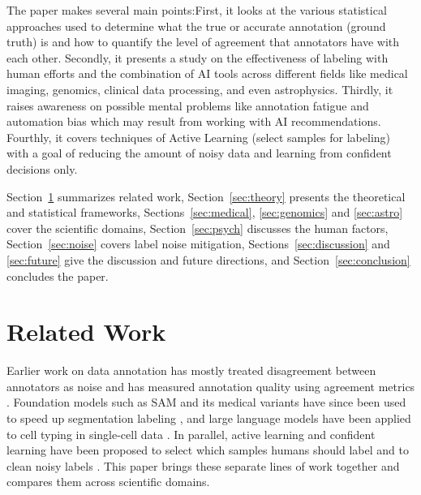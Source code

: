\documentclass[10pt, conference, letterpaper]{IEEEtran}
\newif\ifshowadded
\newcommand{\added}[1]{\ifshowadded{\color{blue}#1}\else #1\fi}
\begin{document}
\added{The‍‍‍ paper makes several main points:First, it looks at the various statistical approaches used to determine what the true or accurate annotation (ground truth) is and how to quantify the level of agreement that annotators have with each other. Secondly, it presents a study on the effectiveness of labeling with human efforts and the combination of AI tools across different fields like medical imaging, genomics, clinical data processing, and even astrophysics. Thirdly, it raises awareness on possible mental problems like annotation fatigue and automation bias which may result from working with AI recommendations.
Fourthly, it covers techniques of Active Learning (select samples for labeling) with a goal of reducing the amount of noisy data and learning from confident decisions ‍‍‍only.

 Section~\ref{sec:related} summarizes related work, Section~\ref{sec:theory} presents the theoretical and statistical frameworks, Sections~\ref{sec:medical}, \ref{sec:genomics} and \ref{sec:astro} cover the scientific domains, Section~\ref{sec:psych} discusses the human factors, Section~\ref{sec:noise} covers label noise mitigation, Sections~\ref{sec:discussion} and \ref{sec:future} give the discussion and future directions, and Section~\ref{sec:conclusion} concludes the paper.}

\section{Related Work}
\label{sec:related}
\added{Earlier work on data annotation has mostly treated disagreement between annotators as noise and has measured annotation quality using agreement metrics \cite{ref1,ref3}. Foundation models such as SAM and its medical variants have since been used to speed up segmentation labeling \cite{ref10,ref12}, and large language models have been applied to cell typing in single-cell data \cite{ref22}. In parallel, active learning and confident learning have been proposed to select which samples humans should label and to clean noisy labels \cite{ref73}. This paper brings these separate lines of work together and compares them across scientific domains.}

\end{document}
